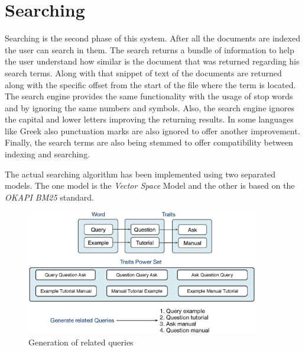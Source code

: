 \documentclass[letterpaper,twocolumn,10pt]{article}
\begin{document}
\section{Searching}
Searching is the second phase of this system. After all the documents are indexed the user can search in them. The search returns a bundle of information to help the user understand how similar is the document that was returned regarding his search terms. Along with that snippet of text of the documents are returned along with the specific offset from the start of the file where the term is located. The search engine provides the same functionality with the usage of stop words and by ignoring the same numbers and symbols. Also, the search engine ignores the capital and lower letters improving the returning results. In some languages like Greek also punctuation marks are also ignored to offer another improvement. Finally, the search terms are also being stemmed to offer compatibility between indexing and searching.

The actual searching algorithm has been implemented using two separated models. The one model is the \emph{ Vector Space} Model and the other is based on the \emph{ OKAPI BM25} standard.

\begin{figure}
    \centering
    \includegraphics[width=4.0in]{RelatedQuery.eps}
    \caption{Generation of related queries}
    \label{Generation of related queries}
\end{figure}
\end{document}
